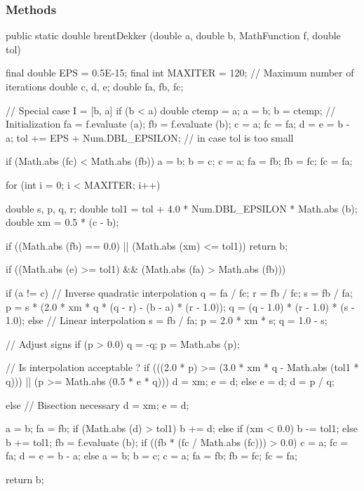 \subsubsection* {Methods}
\begin{code}

   public static double brentDekker (double a, double b,
                                     MathFunction f, double tol)\begin{hide} {
      final double EPS = 0.5E-15;
      final int MAXITER = 120;    // Maximum number of iterations
      double c, d, e;
      double fa, fb, fc;

      // Special case I = [b, a]
      if (b < a) {
         double ctemp = a;
         a = b;
         b = ctemp;
      }
      // Initialization
      fa = f.evaluate (a);
      fb = f.evaluate (b);
      c = a;
      fc = fa;
      d = e = b - a;
      tol += EPS + Num.DBL_EPSILON; // in case tol is too small

      if (Math.abs (fc) < Math.abs (fb)) {
         a = b;
         b = c;
         c = a;
         fa = fb;
         fb = fc;
         fc = fa;
      }

      for (int i = 0; i < MAXITER; i++) {
         double s, p, q, r;
         double tol1 = tol + 4.0 * Num.DBL_EPSILON * Math.abs (b);
         double xm = 0.5 * (c - b);

         if ((Math.abs (fb) == 0.0) || (Math.abs (xm) <= tol1))
            return b;

         if ((Math.abs (e) >= tol1) && (Math.abs (fa) > Math.abs (fb))) {
            if (a != c) {
               // Inverse quadratic interpolation
               q = fa / fc;
               r = fb / fc;
               s = fb / fa;
               p = s * (2.0 * xm * q * (q - r) - (b - a) * (r - 1.0));
               q = (q - 1.0) * (r - 1.0) * (s - 1.0);
            } else {
               // Linear interpolation
               s = fb / fa;
               p = 2.0 * xm * s;
               q = 1.0 - s;
            }

            // Adjust signs
            if (p > 0.0)
               q = -q;
            p = Math.abs (p);

            // Is interpolation acceptable ?
            if (((2.0 * p) >= (3.0 * xm * q - Math.abs (tol1 * q)))
                  || (p >= Math.abs (0.5 * e * q))) {
               d = xm;
               e = d;
            } else {
               e = d;
               d = p / q;
            }
         } else {
            // Bisection necessary
            d = xm;
            e = d;
         }

         a = b;
         fa = fb;
         if (Math.abs (d) > tol1)
            b += d;
         else if (xm < 0.0)
            b -= tol1;
         else
            b += tol1;
         fb = f.evaluate (b);
         if ((fb * (fc / Math.abs (fc))) > 0.0) {
            c = a;
            fc = fa;
            d = e = b - a;
         } else {
            a = b;
            b = c;
            c = a;
            fa = fb;
            fb = fc;
            fc = fa;
         }
      }

      return b;
   }\end{hide}
\end{code}

